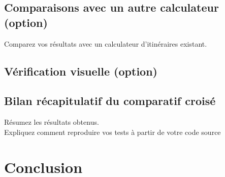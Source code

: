 \subsection{Comparaisons avec un autre calculateur (option)}
Comparez vos résultats avec un calculateur d'itinéraires existant.

\subsection{Vérification visuelle (option)}

\subsection{Bilan récapitulatif du comparatif croisé}
Résumez les résultats obtenus.
\\
Expliquez comment reproduire vos tests à partir de votre code source

\section{Conclusion}
